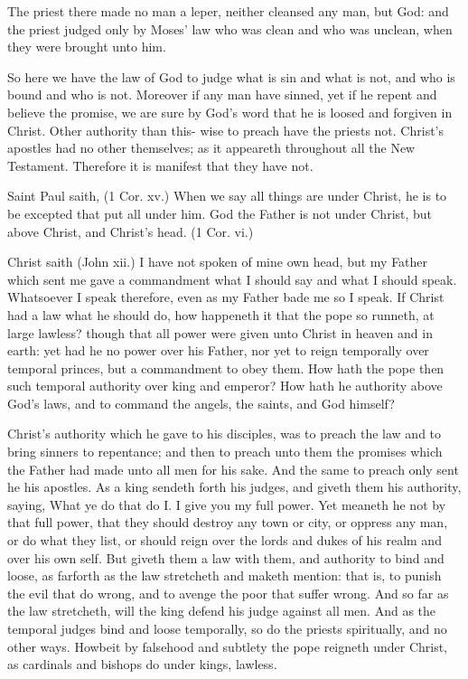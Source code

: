 The priest there made no man a leper, neither cleansed 
any man, but God: and the priest judged only by Moses' 
law who was clean and who was unclean, when they were 
brought unto him. 

So here we have the law of God to judge what is sin and 
what is not, and who is bound and who is not. Moreover 
if any man have sinned, yet if he repent and believe the 
promise, we are sure by God's word that he is loosed 
and forgiven in Christ. Other authority than this- 
wise to preach have the priests not. Christ's apostles 
had no other themselves; as it appeareth throughout all 
the New Testament. Therefore it is manifest that they 
have not. 

Saint Paul saith, (1 Cor. xv.) When we say all things
are under Christ, he is to be excepted that put all under
him. God the Father is not under Christ, but above
Christ, and Christ's head. (1 Cor. vi.)

Christ saith (John xii.) I have not spoken of mine own
head, but my Father which sent me gave a commandment
what I should say and what I should speak. Whatsoever
I speak therefore, even as my Father bade me so I speak.
If Christ had a law what he should do, how happeneth it 
that the pope so runneth, at large lawless? though that all 
power were given unto Christ in heaven and in earth: yet 
had he no power over his Father, nor yet to reign temporally
over temporal princes, but a commandment to obey 
them. How hath the pope then such temporal authority 
over king and emperor? How hath he authority above 
God's laws, and to command the angels, the saints, and 
God himself? 

Christ's authority which he gave to his disciples, was to 
preach the law and to bring sinners to repentance; and 
then to preach unto them the promises which the Father 
had made unto all men for his sake. And the same to 
preach only sent he his apostles. As a king sendeth forth 
his judges, and giveth them his authority, saying, What ye 
do that do I. I give you my full power. Yet meaneth 
he not by that full power, that they should destroy any 
town or city, or oppress any man, or do what they list, or 
should reign over the lords and dukes of his realm and 
over his own self. But giveth them a law with them, and 
authority to bind and loose, as farforth as the law 
stretcheth and maketh mention: that is, to punish the 
evil that do wrong, and to avenge the poor that suffer
wrong. And so far as the law stretcheth, will 
the king defend his judge against all men. And as the 
temporal judges bind and loose temporally, so do the 
priests spiritually, and no other ways. Howbeit by falsehood
and subtlety the pope reigneth under Christ, as cardinals
and bishops do under kings, lawless. 

